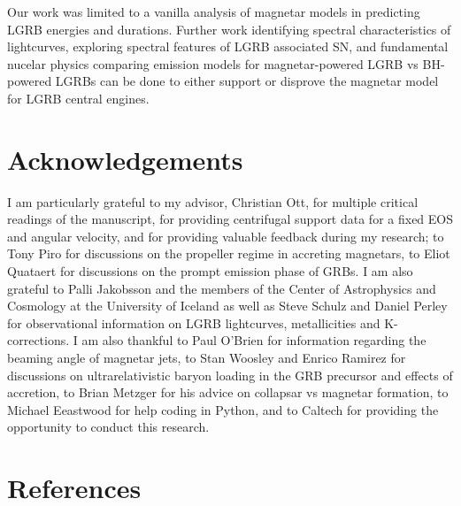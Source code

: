 \documentclass{article}
\begin{document}
Our work was limited to a vanilla analysis of magnetar models in predicting LGRB energies and durations. Further work identifying spectral characteristics of lightcurves, exploring spectral features of LGRB associated SN, and fundamental nucelar physics comparing emission models for magnetar-powered LGRB vs BH-powered LGRBs can be done to either support or disprove the magnetar model for LGRB central engines.

\section{Acknowledgements}
I am particularly grateful to my advisor, Christian Ott, for multiple critical readings of the manuscript, for providing centrifugal support data for a fixed EOS and angular velocity, and for providing valuable feedback during my research; to Tony Piro for discussions on the propeller regime in accreting magnetars, to Eliot Quataert for discussions on the prompt emission phase of GRBs. I am also grateful to Palli Jakobsson and the members of the Center of Astrophysics and Cosmology at the University of Iceland as well as Steve Schulz and Daniel Perley for observational information on LGRB lightcurves,  metallicities and K-corrections. I am also thankful to Paul O'Brien for information regarding the beaming angle of magnetar jets, to Stan Woosley and Enrico Ramirez for discussions on ultrarelativistic baryon loading in the GRB precursor and effects of accretion, to Brian Metzger for his advice on collapsar vs magnetar formation, to Michael Eeastwood for help coding in Python, and to Caltech for providing the opportunity to conduct this research.
\newpage
\clearpage
\renewcommand*{\refname}{}
\section{References}


\end{document}
